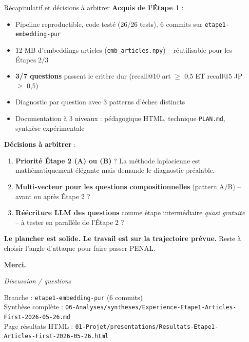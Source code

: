\documentclass[aspectratio=169,10pt]{beamer}
\newcommand{\okbox}[1]{%
  \begin{center}
  \colorbox{green!10}{\parbox{0.92\linewidth}{\centering #1}}
  \end{center}}
\begin{document}
\begin{frame}{Récapitulatif et décisions à arbitrer}
  \small
  \textbf{Acquis de l'Étape 1} :
  \begin{itemize}\setlength\itemsep{0.2em}
    \item Pipeline reproductible, code testé (26/26 tests), 6 commits sur \texttt{etape1-embedding-pur}
    \item 12 MB d'embeddings articles (\texttt{emb\_articles.npy}) -- réutilisable pour les Étapes 2/3
    \item \textbf{3/7 questions} passent le critère dur (recall@10 art $\geq$ 0,5 ET recall@5 JP $\geq$ 0,5)
    \item Diagnostic par question avec 3 patterns d'échec distincts
    \item Documentation à 3 niveaux : pédagogique HTML, technique \texttt{PLAN.md}, synthèse expérimentale
  \end{itemize}

  \vspace{0.4em}
  \textbf{Décisions à arbitrer} :
  \begin{enumerate}\setlength\itemsep{0.2em}
    \item \textbf{Priorité Étape 2 (A) ou (B)} ? La méthode laplacienne est mathématiquement élégante
    mais demande le diagnostic préalable.
    \item \textbf{Multi-vecteur pour les questions compositionnelles} (pattern A/B) -- avant ou après Étape 2 ?
    \item \textbf{Réécriture LLM des questions} comme étape intermédiaire \emph{quasi gratuite} -- à tester en
    parallèle de l'Étape 2 ?
  \end{enumerate}

  \vspace{0.4em}
  \okbox{\textbf{Le plancher est solide. Le travail est sur la trajectoire prévue.}
  Reste à choisir l'angle d'attaque pour faire passer PENAL.}
\end{frame}

\begin{frame}
  \begin{center}
    \vspace{2em}
    {\Large\textbf{Merci.}}
    \vspace{2em}

    \textit{Discussion / questions}

    \vspace{2em}
    \footnotesize
    Branche : \texttt{etape1-embedding-pur} (6 commits)\\
    Synthèse complète : \texttt{06-Analyses/syntheses/Experience-Etape1-Articles-First-2026-05-26.md}\\
    Page résultats HTML : \texttt{01-Projet/presentations/Resultats-Etape1-Articles-First-2026-05-26.html}
  \end{center}
\end{frame}
\end{document}
